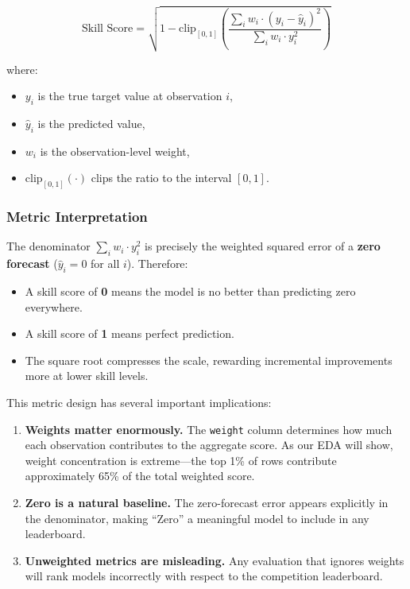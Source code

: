 \begin{equation}
\text{Skill Score} = \sqrt{1 - \text{clip}_{[0,1]}\!\left(\frac{\sum_i w_i \cdot (y_i - \hat{y}_i)^2}{\sum_i w_i \cdot y_i^2}\right)}
\label{eq:skill_score}
\end{equation}

where:
\begin{itemize}
    \item $y_i$ is the true target value at observation $i$,
    \item $\hat{y}_i$ is the predicted value,
    \item $w_i$ is the observation-level weight,
    \item $\text{clip}_{[0,1]}(\cdot)$ clips the ratio to the interval $[0, 1]$.
\end{itemize}

\subsubsection{Metric Interpretation}

The denominator $\sum_i w_i \cdot y_i^2$ is precisely the weighted squared error of a \textbf{zero forecast} ($\hat{y}_i = 0$ for all $i$). Therefore:

\begin{itemize}
    \item A skill score of \textbf{0} means the model is no better than predicting zero everywhere.
    \item A skill score of \textbf{1} means perfect prediction.
    \item The square root compresses the scale, rewarding incremental improvements more at lower skill levels.
\end{itemize}

This metric design has several important implications:
\begin{enumerate}
    \item \textbf{Weights matter enormously.} The \texttt{weight} column determines how much each observation contributes to the aggregate score. As our EDA will show, weight concentration is extreme---the top 1\% of rows contribute approximately 65\% of the total weighted score.
    \item \textbf{Zero is a natural baseline.} The zero-forecast error appears explicitly in the denominator, making ``Zero'' a meaningful model to include in any leaderboard.
    \item \textbf{Unweighted metrics are misleading.} Any evaluation that ignores weights will rank models incorrectly with respect to the competition leaderboard.
\end{enumerate}

